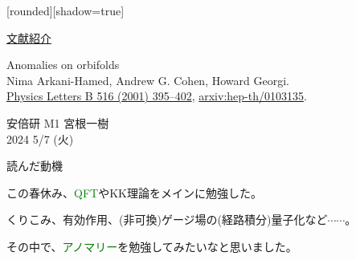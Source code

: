 \documentclass[
  unicode,a4paper,10pt,
  xcolor = {dvipsnames,svgnames},
  hyperref ={colorlinks=true,citecolor=Navy,linkcolor=NavyBlue,urlcolor=purple},
  ja=standard,lualatex
]{beamer}
\begin{document}
\nocite{Arkani-Hamed:2001uol}

\begin{frame}

  [rounded][shadow=true]

  \begin{center}
    \uline{文献紹介}
  \end{center}
  \begin{block}{}
    \vspace*{5pt}

    \centering\Large
    Anomalies on orbifolds
    \\
    \normalsize
    Nima Arkani-Hamed, Andrew G. Cohen, Howard Georgi.
    \\
    \small
    \href{https://doi.org/10.1016/S0370-2693(01)00946-7}{Physics Letters B 516 (2001) 395–402},
    \href{https://doi.org/10.48550/arXiv.hep-th/0103135}{arxiv:hep-th/0103135}.

    \vspace*{5pt}
  \end{block}

  \begin{center}
    安倍研 M1 宮根一樹\\
    2024 5/7 (火)
  \end{center}
\end{frame}


\begin{frame}{読んだ動機}

  この春休み、\textcolor{Green}{QFT}やKK理論をメインに勉強した。

  \vspace*{5pt}
  
  くりこみ、有効作用、(非可換)ゲージ場の(経路積分)量子化など$\cdots\cdots$。

  \vspace*{5pt}

  \pause

  その中で、\textcolor{Green}{アノマリー}を勉強してみたいなと思いました。
  
  

\end{frame}
\end{document}
